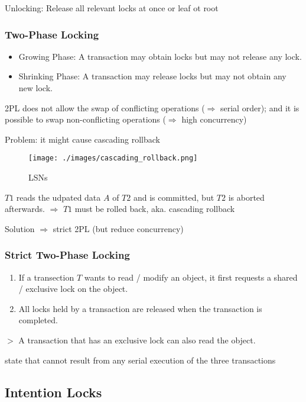 \documentclass[12pt,a4paper]{article}
\newcommand{\remark}[1]{
    $>$ {\color{blue} #1}
}
\begin{document}
Unlocking: Release all relevant locks at once or leaf ot root

\newpage
\subsubsection*{Two-Phase Locking}

\begin{itemize}
    \item Growing Phase: A transaction may obtain locks but may not release any lock.
    \item Shrinking Phase: A transaction may release locks but may not obtain any new lock.
\end{itemize}

2PL does not allow the swap of conflicting operations (\(\Rightarrow\) serial order);
and it is possible to swap non-conflicting operations (\(\Rightarrow\) high concurrency)

Problem: it might cause cascading rollback

\begin{figure}[ht]
    \centering
    \texttt{[image: ./images/cascading\_rollback.png]}
    \caption{LSNs}
\end{figure}

$T1$ reads the udpated data $A$ of $T2$ and is committed,
but $T2$ is aborted afterwards. $\Rightarrow$ $T1$ must be rolled back, aka. cascading rollback

Solution $\Rightarrow$ strict 2PL (but reduce concurrency)

\subsubsection*{Strict Two-Phase Locking}

\begin{enumerate}
    \item If a transection $T$ wants to read / modify an object, it first requests a shared / exclusive lock on the object.
    \item All locks held by a transaction are released when the transaction is completed.
\end{enumerate}

\remark{A transaction that has an exclusive lock can also read the object.}

state that cannot result from any serial execution of the three transactions

\subsection*{Intention Locks}
\end{document}
